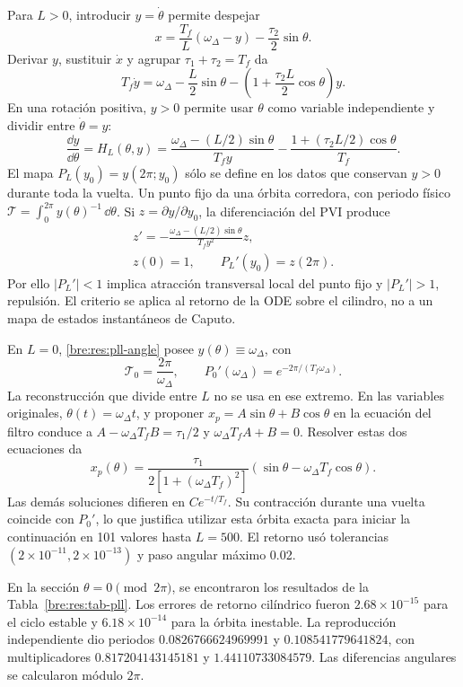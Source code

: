 Para \(L>0\), introducir \(y=\dot\theta\) permite despejar
\[
 x=\frac{T_f}{L}(\omega_\Delta-y)-\frac{\tau_2}{2}\sin\theta.
\]
Derivar \(y\), sustituir \(\dot x\) y agrupar
\(\tau_1+\tau_2=T_f\) da
\[
 T_f\dot y=\omega_\Delta-\frac L2\sin\theta
              -\left(1+\frac{\tau_2L}{2}\cos\theta\right)y.
\]
En una rotación positiva, \(y>0\) permite usar \(\theta\) como variable
independiente y dividir entre \(\dot\theta=y\):
\begin{equation}
 \frac{\dd y}{\dd\theta}=H_L(\theta,y)
 =\frac{\omega_\Delta-(L/2)\sin\theta}{T_fy}
    -\frac{1+(\tau_2L/2)\cos\theta}{T_f}.
 \label{bre:res:pll-angle}
\end{equation}
El mapa \(P_L(y_0)=y(2\pi;y_0)\) sólo se define en los datos que conservan
\(y>0\) durante toda la vuelta. Un punto fijo da una órbita corredora, con
periodo físico \(\mathcal T=\int_0^{2\pi}y(\theta)^{-1}\,\dd\theta\).
Si \(z=\partial y/\partial y_0\), la diferenciación del PVI produce
\[
 \begin{gathered}
 z'=-\frac{\omega_\Delta-(L/2)\sin\theta}{T_f y^2}z,\\
 z(0)=1,\qquad P_L'(y_0)=z(2\pi).
 \end{gathered}
\]
Por ello \(|P_L'|<1\) implica atracción transversal local del punto fijo
y \(|P_L'|>1\), repulsión. El criterio se aplica al retorno de la ODE
sobre el cilindro, no a un mapa de estados instantáneos de Caputo.

En \(L=0\), \eqref{bre:res:pll-angle} posee
\(y(\theta)\equiv\omega_\Delta\), con
\[
 \mathcal T_0=\frac{2\pi}{\omega_\Delta},\qquad
 P_0'(\omega_\Delta)=e^{-2\pi/(T_f\omega_\Delta)}.
\]
La reconstrucción que divide entre \(L\) no se usa en ese extremo.
En las variables originales, \(\theta(t)=\omega_\Delta t\), y proponer
\(x_p=A\sin\theta+B\cos\theta\) en la ecuación del filtro conduce a
\(A-\omega_\Delta T_fB=\tau_1/2\) y
\(\omega_\Delta T_fA+B=0\). Resolver estas dos ecuaciones da
\begin{equation}
 x_p(\theta)=\frac{\tau_1}{2[1+(\omega_\Delta T_f)^2]}
              (\sin\theta-\omega_\Delta T_f\cos\theta).
 \label{bre:res:pll-zero-gain}
\end{equation}
Las demás soluciones difieren en \(Ce^{-t/T_f}\). Su contracción durante
una vuelta coincide con \(P_0'\), lo que justifica utilizar esta órbita
exacta para iniciar la continuación en 101 valores hasta \(L=500\).
El retorno usó tolerancias \((2\times10^{-11},2\times10^{-13})\) y paso
angular máximo 0.02.

En la sección \(\theta=0\pmod{2\pi}\), se encontraron los resultados de
la Tabla~\ref{bre:res:tab-pll}. Los errores de retorno cilíndrico fueron
\(2.68\times10^{-15}\) para el ciclo estable y \(6.18\times10^{-14}\)
para la órbita inestable. La reproducción independiente dio periodos
\(0.0826766624969991\) y \(0.108541779641824\), con multiplicadores
\(0.817204143145181\) y \(1.44110733084579\).
Las diferencias angulares se calcularon módulo \(2\pi\).

